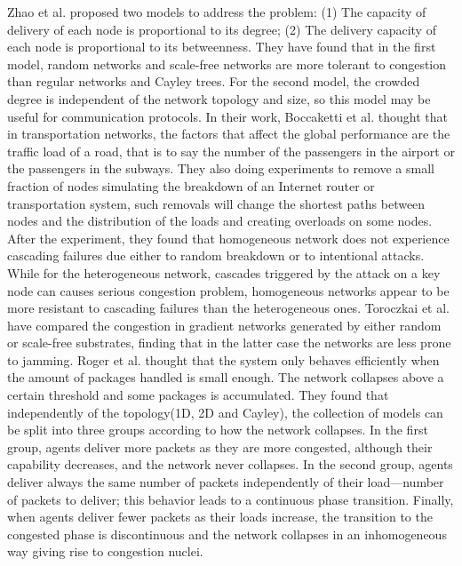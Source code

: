 \documentclass[onecolumn,preprintnumbers,amsmath,amssymb]{revtex4}
\begin{document}
Zhao et al. proposed two models to address the problem: (1) The capacity of delivery of each node is proportional to its degree; (2) The delivery capacity of each node is proportional to its betweenness. They have found that in the first model, random networks and scale-free networks are more tolerant to congestion than regular networks
and Cayley trees. For the second model, the crowded degree is independent of the network topology and size, so this model may be useful for communication protocols\cite{LZY}.
In their work, Boccaketti et al. thought that in transportation networks, the factors that affect the global performance are the traffic load of a road, that is to say the number of the passengers in the airport or the passengers in the subways. They also doing experiments to remove a small fraction of nodes simulating the breakdown of an Internet router or transportation system, such removals will change the shortest paths between nodes and the distribution of the loads and creating overloads on some nodes.
After the experiment, they found that homogeneous network does not experience cascading failures due either to random breakdown or to intentional attacks. While for the heterogeneous network, cascades triggered by the attack on a key node can causes serious congestion problem, homogeneous networks appear to be more resistant to cascading failures than the heterogeneous ones\cite{SBV}.
Toroczkai et al. have compared the congestion in gradient networks generated by either random or scale-free substrates, finding that in the latter case the networks are less prone to jamming\cite{ZTKE,ZTBE}.
Roger et al. thought that the system only behaves efficiently when the amount of packages handled is small enough. The network collapses above a certain threshold and some packages is accumulated. They found that independently of the topology(1D, 2D and Cayley), the collection of models can be split into three groups according to how the network collapses. In the first group, agents deliver more packets as they are more congested, although their capability decreases, and the network never collapses. In the second group, agents deliver always the same number of packets independently of their load—number of packets to deliver; this behavior leads to a continuous phase transition. Finally, when agents deliver fewer packets as their loads increase, the transition to the congested phase is discontinuous and the network collapses in an inhomogeneous way giving rise to congestion nuclei\cite{RGA}.%
\end{document}
